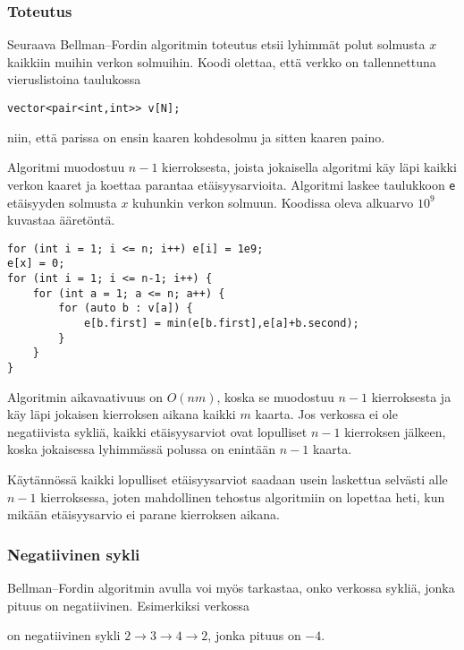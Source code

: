 \subsubsection{Toteutus}

Seuraava Bellman–Fordin algoritmin toteutus
etsii lyhimmät polut solmusta $x$
kaikkiin muihin verkon solmuihin.
Koodi olettaa, että verkko on tallennettuna
vieruslistoina taulukossa
\begin{lstlisting}
vector<pair<int,int>> v[N];
\end{lstlisting}
niin, että parissa on ensin kaaren kohdesolmu
ja sitten kaaren paino.

Algoritmi muodostuu $n-1$ kierroksesta,
joista jokaisella algoritmi käy läpi kaikki
verkon kaaret ja koettaa parantaa etäisyysarvioita.
Algoritmi laskee taulukkoon \texttt{e}
etäisyyden solmusta $x$ kuhunkin verkon solmuun.
Koodissa oleva alkuarvo $10^9$ kuvastaa
ääretöntä.

\begin{lstlisting}
for (int i = 1; i <= n; i++) e[i] = 1e9;
e[x] = 0;
for (int i = 1; i <= n-1; i++) {
    for (int a = 1; a <= n; a++) {
        for (auto b : v[a]) {
            e[b.first] = min(e[b.first],e[a]+b.second);
        }
    }
}
\end{lstlisting}

Algoritmin aikavaativuus on $O(nm)$,
koska se muodostuu $n-1$ kierroksesta ja
käy läpi jokaisen kierroksen aikana kaikki $m$ kaarta.
Jos verkossa ei ole negatiivista sykliä,
kaikki etäisyysarviot ovat lopulliset $n-1$
kierroksen jälkeen, koska jokaisessa lyhimmässä
polussa on enintään $n-1$ kaarta.

Käytännössä kaikki lopulliset etäisyysarviot
saadaan usein laskettua selvästi alle $n-1$ kierroksessa,
joten mahdollinen tehostus algoritmiin on lopettaa heti,
kun mikään etäisyysarvio ei parane kierroksen aikana.

\subsubsection{Negatiivinen sykli}


Bellman–Fordin algoritmin avulla voi myös tarkastaa,
onko verkossa sykliä,
jonka pituus on negatiivinen.
Esimerkiksi verkossa

\begin{center}
\end{center}
\noindent
on negatiivinen sykli $2 \rightarrow 3 \rightarrow 4 \rightarrow 2$,
jonka pituus on $-4$.


